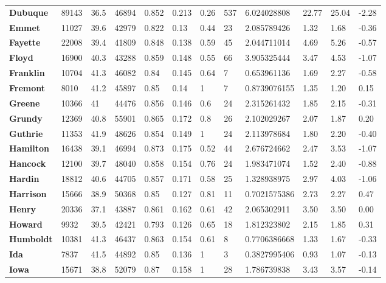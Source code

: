 \documentclass[11pt]{article}
\begin{document}
\begin{table}[H]
\begin{tabular}{llllllllllll}
\textbf{Dubuque} & 89143 & 36.5 & 46894 & 0.852 & 0.213 & 0.26 & 537 & 6.024028808 & 22.77 & 25.04 & -2.28 \\
\textbf{Emmet} & 11027 & 39.6 & 42979 & 0.822 & 0.13 & 0.44 & 23 & 2.085789426 & 1.32 & 1.68 & -0.36 \\
\textbf{Fayette} & 22008 & 39.4 & 41809 & 0.848 & 0.138 & 0.59 & 45 & 2.044711014 & 4.69 & 5.26 & -0.57 \\
\textbf{Floyd} & 16900 & 40.3 & 43288 & 0.859 & 0.148 & 0.55 & 66 & 3.905325444 & 3.47 & 4.53 & -1.07 \\
\textbf{Franklin} & 10704 & 41.3 & 46082 & 0.84 & 0.145 & 0.64 & 7 & 0.653961136 & 1.69 & 2.27 & -0.58 \\
\textbf{Fremont} & 8010 & 41.2 & 45897 & 0.85 & 0.14 & 1 & 7 & 0.8739076155 & 1.35 & 1.20 & 0.15 \\
\textbf{Greene} & 10366 & 41 & 44476 & 0.856 & 0.146 & 0.6 & 24 & 2.315261432 & 1.85 & 2.15 & -0.31 \\
\textbf{Grundy} & 12369 & 40.8 & 55901 & 0.865 & 0.172 & 0.8 & 26 & 2.102029267 & 2.07 & 1.87 & 0.20 \\
\textbf{Guthrie} & 11353 & 41.9 & 48626 & 0.854 & 0.149 & 1 & 24 & 2.113978684 & 1.80 & 2.20 & -0.40 \\
\textbf{Hamilton} & 16438 & 39.1 & 46994 & 0.873 & 0.175 & 0.52 & 44 & 2.676724662 & 2.47 & 3.53 & -1.07 \\
\textbf{Hancock} & 12100 & 39.7 & 48040 & 0.858 & 0.154 & 0.76 & 24 & 1.983471074 & 1.52 & 2.40 & -0.88 \\
\textbf{Hardin} & 18812 & 40.6 & 44705 & 0.857 & 0.171 & 0.58 & 25 & 1.328938975 & 2.97 & 4.03 & -1.06 \\
\textbf{Harrison} & 15666 & 38.9 & 50368 & 0.85 & 0.127 & 0.81 & 11 & 0.7021575386 & 2.73 & 2.27 & 0.47 \\
\textbf{Henry} & 20336 & 37.1 & 43887 & 0.861 & 0.162 & 0.61 & 42 & 2.065302911 & 3.50 & 3.50 & 0.00 \\
\textbf{Howard} & 9932 & 39.5 & 42421 & 0.793 & 0.126 & 0.65 & 18 & 1.812323802 & 2.15 & 1.85 & 0.31 \\
\textbf{Humboldt} & 10381 & 41.3 & 46437 & 0.863 & 0.154 & 0.61 & 8 & 0.7706386668 & 1.33 & 1.67 & -0.33 \\
\textbf{Ida} & 7837 & 41.5 & 44892 & 0.85 & 0.136 & 1 & 3 & 0.3827995406 & 0.93 & 1.07 & -0.13 \\
\textbf{Iowa} & 15671 & 38.8 & 52079 & 0.87 & 0.158 & 1 & 28 & 1.786739838 & 3.43 & 3.57 & -0.14 \\

\end{tabular}
\end{table}
\end{document}
